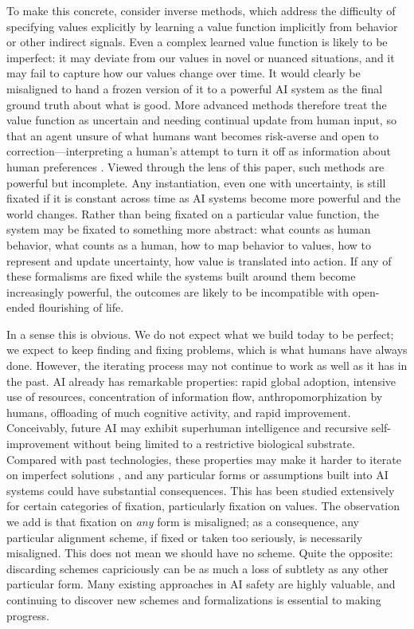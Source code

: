 \documentclass[11pt]{article}
\begin{document}
To make this concrete, consider inverse methods, which address the difficulty of specifying values explicitly by learning a value function implicitly from behavior or other indirect signals. Even a complex learned value function is likely to be imperfect: it may deviate from our values in novel or nuanced situations, and it may fail to capture how our values change over time. It would clearly be misaligned to hand a frozen version of it to a powerful AI system as the final ground truth about what is good. More advanced methods therefore treat the value function as uncertain and needing continual update from human input, so that an agent unsure of what humans want becomes risk-averse and open to correction---interpreting a human's attempt to turn it off as information about human preferences \citep{hadfieldmenell2016cooperative, jeon2020reward}. Viewed through the lens of this paper, such methods are powerful but incomplete. Any instantiation, even one with uncertainty, is still fixated if it is constant across time as AI systems become more powerful and the world changes. Rather than being fixated on a particular value function, the system may be fixated to something more abstract: what counts as human behavior, what counts as a human, how to map behavior to values, how to represent and update uncertainty, how value is translated into action. If any of these formalisms are fixed while the systems built around them become increasingly powerful, the outcomes are likely to be incompatible with open-ended flourishing of life.

In a sense this is obvious. We do not expect what we build today to be perfect; we expect to keep finding and fixing problems, which is what humans have always done. However, the iterating process may not continue to work as well as it has in the past. AI already has remarkable properties: rapid global adoption, intensive use of resources, concentration of information flow, anthropomorphization by humans, offloading of much cognitive activity, and rapid improvement. Conceivably, future AI may exhibit superhuman intelligence and recursive self-improvement without being limited to a restrictive biological substrate. Compared with past technologies, these properties may make it harder to iterate on imperfect solutions \citep{bostrom2014superintelligence}, and any particular forms or assumptions built into AI systems could have substantial consequences. This has been studied extensively for certain categories of fixation, particularly fixation on values. The observation we add is that fixation on \textit{any} form is misaligned; as a consequence, any particular alignment scheme, if fixed or taken too seriously, is necessarily misaligned. This does not mean we should have no scheme. Quite the opposite: discarding schemes capriciously can be as much a loss of subtlety as any other particular form. Many existing approaches in AI safety are highly valuable, and continuing to discover new schemes and formalizations is essential to making progress.
\end{document}
